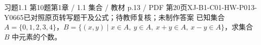 \par\noindent\begin{minipage}{\linewidth}
\begin{bankitem}{习题1.1 第10题}{第1章 / 1.1 集合 / 教材 p.13 / PDF 第20页}{XJ-B1-C01-HW-P013-Y0665}{已对照原页转写题干及公式；待教师复核；未制作答案}
已知集合 $A=\{0,1,2,3,4\}$，$B=\{(x,y)\mid x\in A,\ y\in A,\ x+y\in A,\ x-y\in A\}$，求集合 $B$ 中元素的个数。
\end{bankitem}
\end{minipage}\par\medskip
